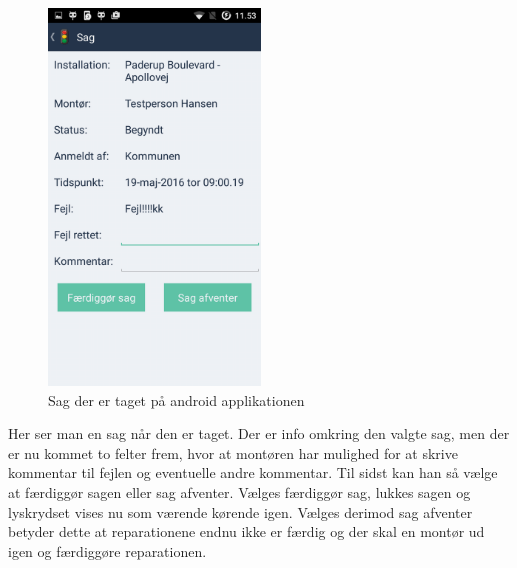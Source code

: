 	\begin{figure} [!ht]
		\begin{center}
			\includegraphics[height=10cm]{Android/Billeder/AndroidSagGul}
		\end{center}
		\caption{Sag der er taget på android applikationen}
		\label{fig:Sag der er taget på android applikationen}
	\end{figure}
	Her ser man en sag når den er taget. Der er info omkring den valgte sag, men der er nu kommet to felter frem, hvor at montøren har mulighed for at skrive kommentar til fejlen og eventuelle andre kommentar. Til sidst kan han så vælge at færdiggør sagen eller sag afventer. Vælges færdiggør sag, lukkes sagen og lyskrydset vises nu som værende kørende igen. Vælges derimod sag afventer betyder dette at reparationene endnu ikke er færdig og der skal en montør ud igen og færdiggøre reparationen.
	
	\pagebreak
	

